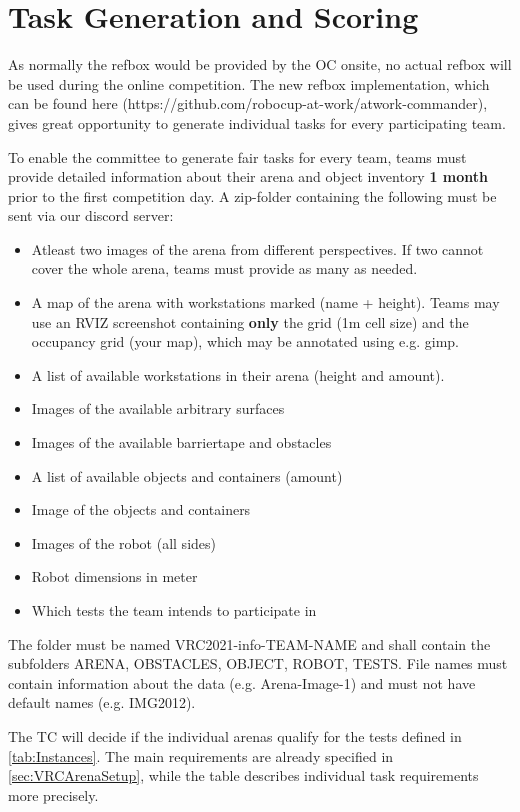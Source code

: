 \section{Task Generation and Scoring} 
\label{sec:VRCTaskGen}

As normally the refbox would be provided by the OC onsite, no actual refbox will be used during the online competition.
The new refbox implementation, which can be found here (https://github.com/robocup-at-work/atwork-commander), 
gives great opportunity to generate individual tasks for every participating team.

To enable the committee to generate fair tasks for every team, teams must provide detailed information about their arena and object inventory \textbf{1 month} prior to the first competition day. A zip-folder containing the following must be sent via our discord server:

\begin{itemize}
\item Atleast two images of the arena from different perspectives. If two cannot cover the whole arena, teams must provide as many as needed.
\item A map of the arena with workstations marked (name + height). Teams may use an RVIZ screenshot containing \textbf{only} the grid (1m cell size) and the occupancy grid (your map), which may be annotated using e.g. gimp.
\item A list of available workstations in their arena (height and amount).
\item Images of the available arbitrary surfaces
\item Images of the available barriertape and obstacles
\item A list of available objects and containers (amount)
\item Image of the objects and containers
\item Images of the robot (all sides)
\item Robot dimensions in meter
\item Which tests the team intends to participate in
\end{itemize}

The folder must be named VRC2021-info-TEAM-NAME and shall contain the subfolders ARENA, OBSTACLES, OBJECT, ROBOT, TESTS. 
File names must contain information about the data (e.g. Arena-Image-1) and must not have default names (e.g. IMG2012).

The TC will decide if the individual arenas qualify for the tests defined in \ref{tab:Instances}. 
The main requirements are already specified in \ref{sec:VRCArenaSetup}, while the table describes individual task requirements more precisely.
 
